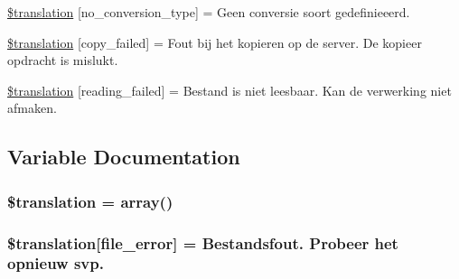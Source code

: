 \begin{DoxyCompactItemize}
\item 
\hyperlink{class_8upload_8nl___n_l_8php_a4712d7ec28e9a7f17eb3338af2358363}{\$translation} \mbox{[}\textquotesingle{}no\+\_\+conversion\+\_\+type\textquotesingle{}\mbox{]} = \textquotesingle{}Geen conversie soort gedefinieeerd.\textquotesingle{}
\item 
\hyperlink{class_8upload_8nl___n_l_8php_a783c9358bcf54a054545b50098bc679b}{\$translation} \mbox{[}\textquotesingle{}copy\+\_\+failed\textquotesingle{}\mbox{]} = \textquotesingle{}Fout bij het kopieren op de server. De kopieer opdracht is mislukt.\textquotesingle{}
\item 
\hyperlink{class_8upload_8nl___n_l_8php_a01bea14c9fd5f353f62db44beabfcd42}{\$translation} \mbox{[}\textquotesingle{}reading\+\_\+failed\textquotesingle{}\mbox{]} = \textquotesingle{}Bestand is niet leesbaar. Kan de verwerking niet afmaken.\textquotesingle{}
\end{DoxyCompactItemize}


\subsection{Variable Documentation}
\hypertarget{class_8upload_8nl___n_l_8php_a1f198d410fecc3871ebdd468d343a5e3}{}
\subsubsection[{\$translation}]{\setlength{\rightskip}{0pt plus 5cm}\$translation = array()}\label{class_8upload_8nl___n_l_8php_a1f198d410fecc3871ebdd468d343a5e3}
\hypertarget{class_8upload_8nl___n_l_8php_ac7498e49b9771b04698029aa61c70821}{}
\subsubsection[{\$translation}]{\setlength{\rightskip}{0pt plus 5cm}\$translation\mbox{[}\textquotesingle{}file\+\_\+error\textquotesingle{}\mbox{]} = \textquotesingle{}Bestandsfout. Probeer het opnieuw svp.\textquotesingle{}}\label{class_8upload_8nl___n_l_8php_ac7498e49b9771b04698029aa61c70821}
\hypertarget{class_8upload_8nl___n_l_8php_a6ec3d3a47ab70d77e7aa593e82ead10e}{}
